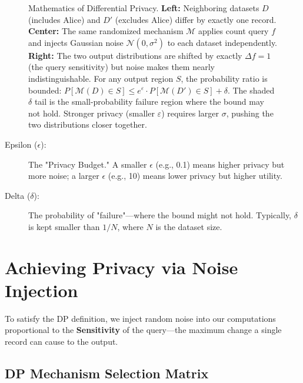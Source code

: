 \begin{figure}[t]
\caption{Mathematics of Differential Privacy.
\textbf{Left:} Neighboring datasets $D$ (includes Alice) and $D'$ (excludes Alice) differ by exactly one record.
\textbf{Center:} The same randomized mechanism $\mathcal{M}$ applies count query $f$ and injects Gaussian noise $\mathcal{N}(0,\sigma^2)$ to each dataset independently.
\textbf{Right:} The two output distributions are shifted by exactly $\Delta f{=}1$ (the query sensitivity) but noise makes them nearly indistinguishable. For any output region $S$, the probability ratio is bounded: $P[\mathcal{M}(D)\in S] \leq e^\varepsilon \cdot P[\mathcal{M}(D')\in S] + \delta$. The shaded $\delta$ tail is the small-probability failure region where the bound may not hold. Stronger privacy (smaller $\varepsilon$) requires larger $\sigma$, pushing the two distributions closer together.}
\label{fig:ch5_dp_noise}
\end{figure}

\begin{description}
  \item[Epsilon ($\epsilon$):] 
        The "Privacy Budget." A smaller $\epsilon$ (e.g., 0.1) means higher privacy but more noise; a larger $\epsilon$ (e.g., 10) means lower privacy but higher utility.
  \item[Delta ($\delta$):]
        The probability of "failure"---where the bound might not hold. Typically, $\delta$ is kept smaller than $1/N$, where $N$ is the dataset size.
\end{description}

\section{Achieving Privacy via Noise Injection}
\label{sec:dp_mechanisms}

To satisfy the DP definition, we inject random noise into our computations proportional to the \textbf{Sensitivity} of the query---the maximum change a single record can cause to the output.

\subsection{DP Mechanism Selection Matrix}
\label{subsec:dp_mechanism_matrix}

